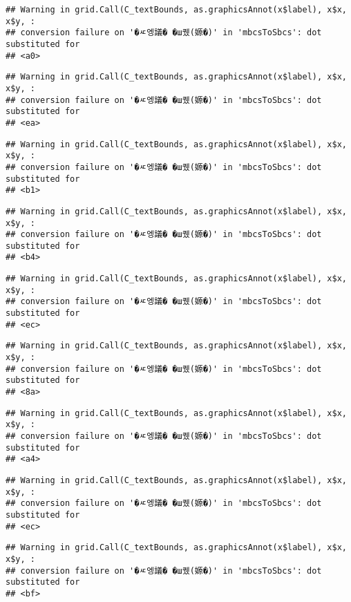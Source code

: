 \documentclass[
]{article}
\begin{document}
\begin{verbatim}
## Warning in grid.Call(C_textBounds, as.graphicsAnnot(x$label), x$x, x$y, :
## conversion failure on '�ㅼ엥議� �ш퀬(嫄�)' in 'mbcsToSbcs': dot substituted for
## <a0>
\end{verbatim}

\begin{verbatim}
## Warning in grid.Call(C_textBounds, as.graphicsAnnot(x$label), x$x, x$y, :
## conversion failure on '�ㅼ엥議� �ш퀬(嫄�)' in 'mbcsToSbcs': dot substituted for
## <ea>
\end{verbatim}

\begin{verbatim}
## Warning in grid.Call(C_textBounds, as.graphicsAnnot(x$label), x$x, x$y, :
## conversion failure on '�ㅼ엥議� �ш퀬(嫄�)' in 'mbcsToSbcs': dot substituted for
## <b1>
\end{verbatim}

\begin{verbatim}
## Warning in grid.Call(C_textBounds, as.graphicsAnnot(x$label), x$x, x$y, :
## conversion failure on '�ㅼ엥議� �ш퀬(嫄�)' in 'mbcsToSbcs': dot substituted for
## <b4>
\end{verbatim}

\begin{verbatim}
## Warning in grid.Call(C_textBounds, as.graphicsAnnot(x$label), x$x, x$y, :
## conversion failure on '�ㅼ엥議� �ш퀬(嫄�)' in 'mbcsToSbcs': dot substituted for
## <ec>
\end{verbatim}

\begin{verbatim}
## Warning in grid.Call(C_textBounds, as.graphicsAnnot(x$label), x$x, x$y, :
## conversion failure on '�ㅼ엥議� �ш퀬(嫄�)' in 'mbcsToSbcs': dot substituted for
## <8a>
\end{verbatim}

\begin{verbatim}
## Warning in grid.Call(C_textBounds, as.graphicsAnnot(x$label), x$x, x$y, :
## conversion failure on '�ㅼ엥議� �ш퀬(嫄�)' in 'mbcsToSbcs': dot substituted for
## <a4>
\end{verbatim}

\begin{verbatim}
## Warning in grid.Call(C_textBounds, as.graphicsAnnot(x$label), x$x, x$y, :
## conversion failure on '�ㅼ엥議� �ш퀬(嫄�)' in 'mbcsToSbcs': dot substituted for
## <ec>
\end{verbatim}

\begin{verbatim}
## Warning in grid.Call(C_textBounds, as.graphicsAnnot(x$label), x$x, x$y, :
## conversion failure on '�ㅼ엥議� �ш퀬(嫄�)' in 'mbcsToSbcs': dot substituted for
## <bf>
\end{verbatim}
\end{document}

